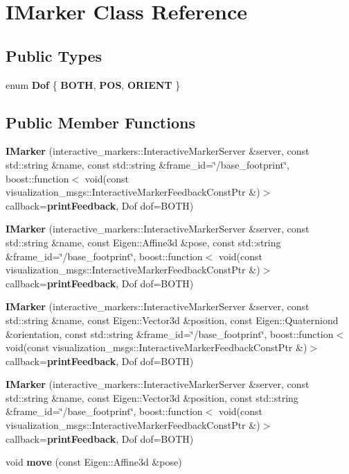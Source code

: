\section{I\-Marker Class Reference}
\label{class_i_marker}
\subsection*{Public Types}
\begin{DoxyCompactItemize}
\item 
enum {\bfseries Dof} \{ {\bfseries B\-O\-T\-H}, 
{\bfseries P\-O\-S}, 
{\bfseries O\-R\-I\-E\-N\-T}
 \}
\end{DoxyCompactItemize}
\subsection*{Public Member Functions}
\begin{DoxyCompactItemize}
\item 
{\bf I\-Marker} (interactive\-\_\-markers\-::\-Interactive\-Marker\-Server \&server, const std\-::string \&name, const std\-::string \&frame\-\_\-id=\char`\"{}/base\-\_\-footprint\char`\"{}, boost\-::function$<$ void(const visualization\-\_\-msgs\-::\-Interactive\-Marker\-Feedback\-Const\-Ptr \&)$>$ callback={\bf print\-Feedback}, Dof dof=B\-O\-T\-H)
\item 
{\bf I\-Marker} (interactive\-\_\-markers\-::\-Interactive\-Marker\-Server \&server, const std\-::string \&name, const Eigen\-::\-Affine3d \&pose, const std\-::string \&frame\-\_\-id=\char`\"{}/base\-\_\-footprint\char`\"{}, boost\-::function$<$ void(const visualization\-\_\-msgs\-::\-Interactive\-Marker\-Feedback\-Const\-Ptr \&)$>$ callback={\bf print\-Feedback}, Dof dof=B\-O\-T\-H)
\item 
{\bf I\-Marker} (interactive\-\_\-markers\-::\-Interactive\-Marker\-Server \&server, const std\-::string \&name, const Eigen\-::\-Vector3d \&position, const Eigen\-::\-Quaterniond \&orientation, const std\-::string \&frame\-\_\-id=\char`\"{}/base\-\_\-footprint\char`\"{}, boost\-::function$<$ void(const visualization\-\_\-msgs\-::\-Interactive\-Marker\-Feedback\-Const\-Ptr \&)$>$ callback={\bf print\-Feedback}, Dof dof=B\-O\-T\-H)
\item 
{\bf I\-Marker} (interactive\-\_\-markers\-::\-Interactive\-Marker\-Server \&server, const std\-::string \&name, const Eigen\-::\-Vector3d \&position, const std\-::string \&frame\-\_\-id=\char`\"{}/base\-\_\-footprint\char`\"{}, boost\-::function$<$ void(const visualization\-\_\-msgs\-::\-Interactive\-Marker\-Feedback\-Const\-Ptr \&)$>$ callback={\bf print\-Feedback}, Dof dof=B\-O\-T\-H)
\item 
void {\bf move} (const Eigen\-::\-Affine3d \&pose)
\end{DoxyCompactItemize}
